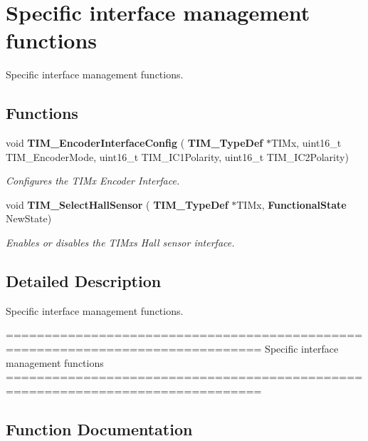 \section{Specific interface management functions}
\label{group__TIM__Group8}


Specific interface management functions.  


\subsection*{Functions}
\begin{DoxyCompactItemize}
\item 
void \textbf{ T\+I\+M\+\_\+\+Encoder\+Interface\+Config} (\textbf{ T\+I\+M\+\_\+\+Type\+Def} $\ast$T\+I\+Mx, uint16\+\_\+t T\+I\+M\+\_\+\+Encoder\+Mode, uint16\+\_\+t T\+I\+M\+\_\+\+I\+C1\+Polarity, uint16\+\_\+t T\+I\+M\+\_\+\+I\+C2\+Polarity)
\begin{DoxyCompactList}\small\item\em Configures the T\+I\+Mx Encoder Interface. \end{DoxyCompactList}\item 
void \textbf{ T\+I\+M\+\_\+\+Select\+Hall\+Sensor} (\textbf{ T\+I\+M\+\_\+\+Type\+Def} $\ast$T\+I\+Mx, \textbf{ Functional\+State} New\+State)
\begin{DoxyCompactList}\small\item\em Enables or disables the T\+I\+Mx\textquotesingle{}s Hall sensor interface. \end{DoxyCompactList}\end{DoxyCompactItemize}


\subsection{Detailed Description}
Specific interface management functions. 

\begin{DoxyVerb} ===============================================================================
                    Specific interface management functions
 ===============================================================================  \end{DoxyVerb}
 

\subsection{Function Documentation}
\mbox{\label{group__TIM__Group8_ga0fc7e76c47a3bd1ba1ebc71427832b51}} 
